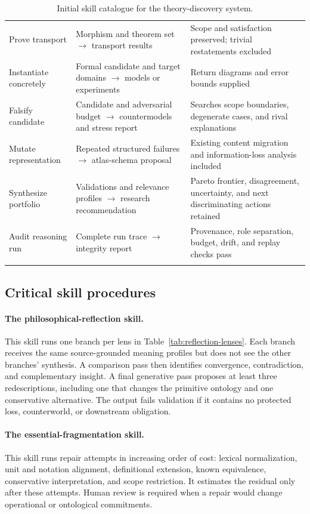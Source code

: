 \documentclass[11pt]{article}
\begin{document}
\begin{longtable}{@{}
>{\raggedright\arraybackslash}p{}
>{\raggedright\arraybackslash}p{}
>{\raggedright\arraybackslash}p{}@{}}
Prove transport & Morphism and theorem set \(\to\) transport results & Scope and satisfaction preserved; trivial restatements excluded \\
Instantiate concretely & Formal candidate and target domains \(\to\) models or experiments & Return diagrams and error bounds supplied \\
Falsify candidate & Candidate and adversarial budget \(\to\) countermodels and stress report & Searches scope boundaries, degenerate cases, and rival explanations \\
Mutate representation & Repeated structured failures \(\to\) atlas-schema proposal & Existing content migration and information-loss analysis included \\
Synthesize portfolio & Validations and relevance profiles \(\to\) research recommendation & Pareto frontier, disagreement, uncertainty, and next discriminating actions retained \\
Audit reasoning run & Complete run trace \(\to\) integrity report & Provenance, role separation, budget, drift, and replay checks pass \\
\bottomrule
\caption{Initial skill catalogue for the theory-discovery system.}
\label{tab:skills}
\end{longtable}

\subsection{Critical skill procedures}

\paragraph{The philosophical-reflection skill.}
This skill runs one branch per lens in Table~\ref{tab:reflection-lenses}. Each branch receives the same
source-grounded meaning profiles but does not see the other branches' synthesis. A comparison pass then
identifies convergence, contradiction, and complementary insight. A final generative pass proposes at
least three redescriptions, including one that changes the primitive ontology and one conservative
alternative. The output fails validation if it contains no protected loss, counterworld, or downstream
obligation.

\paragraph{The essential-fragmentation skill.}
This skill runs repair attempts in increasing order of cost: lexical normalization, unit and notation
alignment, definitional extension, known equivalence, conservative interpretation, and scope
restriction. It estimates the residual only after these attempts. Human review is required when a
repair would change operational or ontological commitments.
\end{document}
